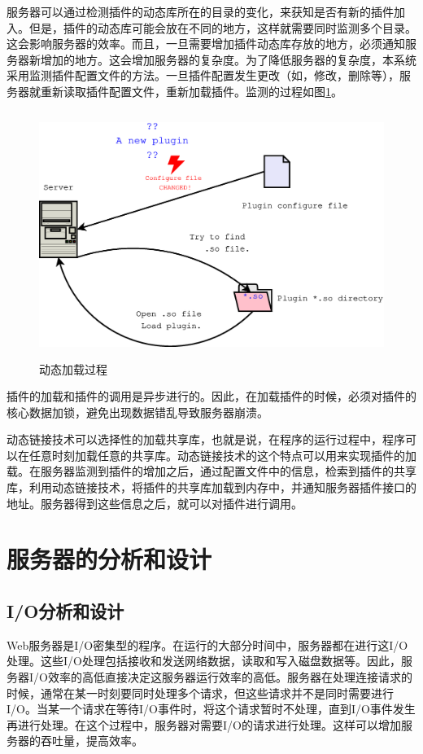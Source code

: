 \documentclass[12pt, twoside, a4paper, xetex]{report}
\begin{document}
	服务器可以通过检测插件的动态库所在的目录的变化，来获知是否有新的插件加入。但是，插件的动态库可能会放在不同的地方，这样就需要同时监测多个目录。这会影响服务器的效率。而且，一旦需要增加插件动态库存放的地方，必须通知服务器新增加的地方。这会增加服务器的复杂度。为了降低服务器的复杂度，本系统采用监测插件配置文件的方法。一旦插件配置发生更改（如，修改，删除等），服务器就重新读取插件配置文件，重新加载插件。监测的过程如图\ref{loadplugin}。
	\begin{figure}[htbp]
	\centering
	\caption{动态加载过程}
	\label{loadplugin}
	\includegraphics[height=8cm, width=13cm]{pics/loadplugin.eps}
	\end{figure}
	
	插件的加载和插件的调用是异步进行的。因此，在加载插件的时候，必须对插件的核心数据加锁，避免出现数据错乱导致服务器崩溃。
	
	动态链接技术可以选择性的加载共享库，也就是说，在程序的运行过程中，程序可以在任意时刻加载任意的共享库。动态链接技术的这个特点可以用来实现插件的加载。在服务器监测到插件的增加之后，通过配置文件中的信息，检索到插件的共享库，利用动态链接技术，将插件的共享库加载到内存中，并通知服务器插件接口的地址。服务器得到这些信息之后，就可以对插件进行调用。

\section{服务器的分析和设计}
\subsection{I/O分析和设计}
	Web服务器是I/O密集型的程序。在运行的大部分时间中，服务器都在进行这I/O处理。这些I/O处理包括接收和发送网络数据，读取和写入磁盘数据等。因此，服务器I/O效率的高低直接决定这服务器运行效率的高低。服务器在处理连接请求的时候，通常在某一时刻要同时处理多个请求，但这些请求并不是同时需要进行I/O。当某一个请求在等待I/O事件时，将这个请求暂时不处理，直到I/O事件发生再进行处理。在这个过程中，服务器对需要I/O的请求进行处理。这样可以增加服务器的吞吐量，提高效率。
	
\end{document}

